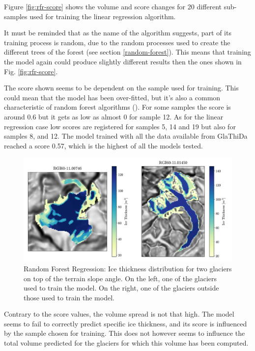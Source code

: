 Figure \ref{fig:rfr-score} shows the volume and score changes for 20 different sub-samples used for training the linear regression algorithm. 

It must be reminded that as the name of the algorithm suggests, part of its training process is random, due to the random processes used to create the different trees of the forest (see section \ref{random-forest}). This means that training the model again could produce slightly different results then the ones shown in Fig. \ref{fig:rfr-score}.

The score shown seems to be dependent on the sample used for training. This could mean that the model has been over-fitted, but it's also a common characteristic of random forest algorithms (\citet{RandomForest2018}). For some samples the score is around 0.6 but it gets as low as almost 0 for sample 12. As for the linear regression case low scores are registered for samples 5, 14 and 19 but also for samples 8, and 12. 
The model trained with all the data available from GlaThiDa reached a score 0.57, which is the highest of all the models tested.


\begin{figure}[!tp]
	\centering		  
	\includegraphics[width=1.\textwidth]{figures/RFR_thick_map.pdf}
	\caption{Random Forest Regression: Ice thickness distribution for two glaciers on top of the terrain slope angle. On the left, one of the glaciers used to train the model. On the right, one of the glaciers outside those used to train the model.}
	\label{fig:rfr-map}
\end{figure}

Contrary to the score values, the volume spread is not that high. The model seems to fail to correctly predict specific ice thickness, and its score is influenced by the sample chosen for training. This does not however seems to influence the total volume predicted for the glaciers for which this volume has been computed.


